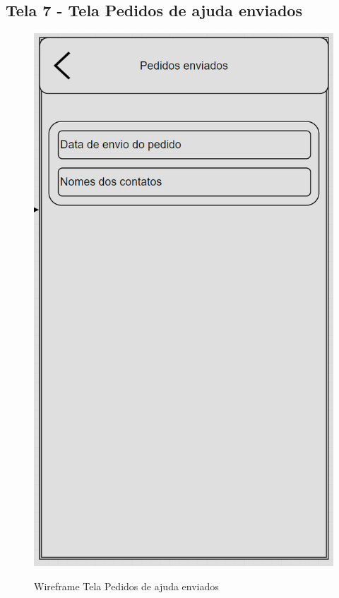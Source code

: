 \subsection{Tela 7 - Tela Pedidos de ajuda enviados}
\begin{figure}[h]
  \begin{center}
  \includegraphics[width=0.2\linewidth]{images/wire-tela-pedidos-enviados.png}\\
  \end{center}
  \caption[Wireframe Tela Pedidos de ajuda enviados]{Wireframe Tela Pedidos de ajuda enviados}
  \label{fig:wireframe-tela-pedidos-ajuda}
\end{figure}
\clearpage
